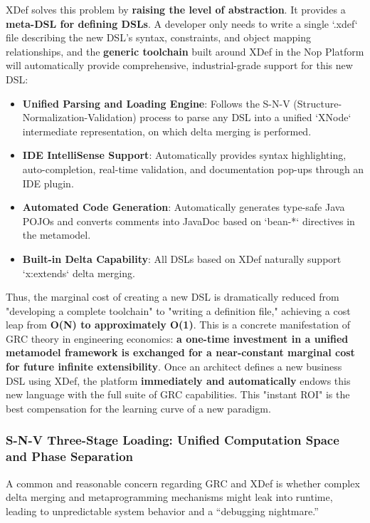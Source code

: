 \documentclass[11pt]{article}
\begin{document}
XDef solves this problem by \textbf{raising the level of abstraction}. It provides a \textbf{meta-DSL for defining DSLs}. A developer only needs to write a single `.xdef` file describing the new DSL's syntax, constraints, and object mapping relationships, and the \textbf{generic toolchain} built around XDef in the Nop Platform will automatically provide comprehensive, industrial-grade support for this new DSL:
\begin{itemize}
    \item \textbf{Unified Parsing and Loading Engine}: Follows the S-N-V (Structure-Normalization-Validation) process to parse any DSL into a unified `XNode` intermediate representation, on which delta merging is performed.
    \item \textbf{IDE IntelliSense Support}: Automatically provides syntax highlighting, auto-completion, real-time validation, and documentation pop-ups through an IDE plugin.
    \item \textbf{Automated Code Generation}: Automatically generates type-safe Java POJOs and converts comments into JavaDoc based on `bean-*` directives in the metamodel.
    \item \textbf{Built-in Delta Capability}: All DSLs based on XDef naturally support `x:extends` delta merging.
\end{itemize}

Thus, the marginal cost of creating a new DSL is dramatically reduced from "developing a complete toolchain" to "writing a definition file," achieving a cost leap from \textbf{O(N) to approximately O(1)}. This is a concrete manifestation of GRC theory in engineering economics: \textbf{a one-time investment in a unified metamodel framework is exchanged for a near-constant marginal cost for future infinite extensibility}. Once an architect defines a new business DSL using XDef, the platform \textbf{immediately and automatically} endows this new language with the full suite of GRC capabilities. This "instant ROI" is the best compensation for the learning curve of a new paradigm.

\subsubsection{S-N-V Three-Stage Loading: Unified Computation Space and Phase Separation}

A common and reasonable concern regarding GRC and XDef is whether complex delta merging and metaprogramming mechanisms might leak into runtime, leading to unpredictable system behavior and a ``debugging nightmare.''
\end{document}
